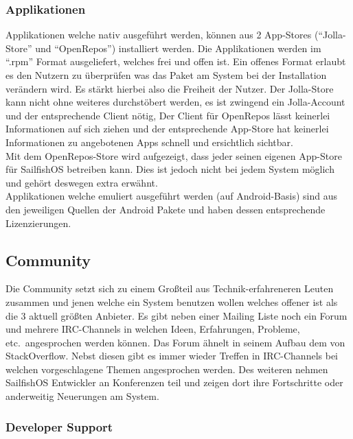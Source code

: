 \subsubsection{Applikationen}
Applikationen welche nativ ausgeführt werden, können aus 2 App-Stores (``Jolla-Store'' und ``OpenRepos''\cite{online:openrepos}) installiert werden. Die Applikationen werden im ``\mbox{.rpm}'' Format ausgeliefert, welches frei und offen\cite{online:rpm-license} ist. Ein offenes Format erlaubt es den Nutzern zu überprüfen was das Paket am System bei der Installation verändern wird. Es stärkt hierbei also die Freiheit der Nutzer. Der Jolla-Store kann nicht ohne weiteres durchstöbert werden, es ist zwingend ein Jolla-Account und der entsprechende Client nötig\cite{online:jolla-store}, Der Client für OpenRepos lässt keinerlei Informationen auf sich ziehen und der entsprechende App-Store hat keinerlei Informationen zu angebotenen Apps schnell und ersichtlich sichtbar.\\
Mit dem OpenRepos-Store wird aufgezeigt, dass jeder seinen eigenen App-Store für \mbox{SailfishOS} betreiben kann. Dies ist jedoch nicht bei jedem System möglich und gehört deswegen extra erwähnt.\\
Applikationen welche emuliert ausgeführt werden (auf Android-Basis) sind aus den jeweiligen Quellen der Android Pakete und haben dessen entsprechende Lizenzierungen.\\

\subsection{Community}
Die Community setzt sich zu einem Großteil aus Technik-erfahreneren Leuten zusammen und jenen welche ein System benutzen wollen welches offener ist als die 3 aktuell größten Anbieter. Es gibt neben einer Mailing Liste noch ein Forum und mehrere IRC-Channels\cite{online:sailfish-communitygeneral} in welchen Ideen, Erfahrungen, Probleme, etc.\ angesprochen werden können. Das Forum ähnelt in seinem Aufbau dem von StackOverflow. Nebst diesen gibt es immer wieder Treffen in IRC-Channels bei welchen vorgeschlagene Themen angesprochen werden. Des weiteren nehmen SailfishOS Entwickler an Konferenzen teil und zeigen dort ihre Fortschritte oder anderweitig Neuerungen am System\cite{online:sailfish-communitygeneral}.
\subsubsection{Developer Support}
\iffalse
\cite{online:jolla-store-terms}
https://harbour.jolla.com/\\
https://github.com/sailfishos\\
https://talk.maemo.org/showthread.php?t=92852\\
http://talk.maemo.org/showthread.php?p=1482661\#post1482661\\
http://www.nuance.com/for-business/by-product/xt9/index.htm\\
https://github.com/maliit\\
https://talk.maemo.org/showthread.php?t=92036\\
\fi

